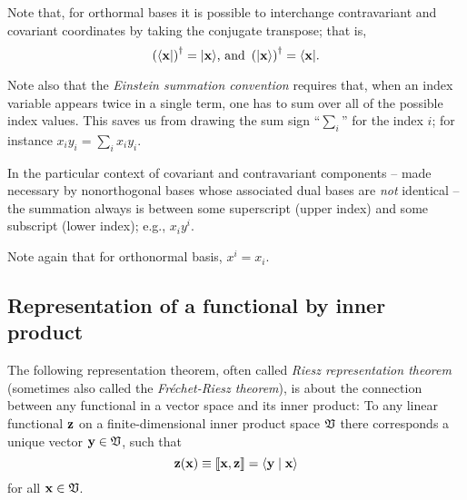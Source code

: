 Note that, for orthormal bases it is possible to interchange contravariant and covariant coordinates by
taking the conjugate transpose; that is,
\begin{equation}
\left(\langle {\bf x} \vert \right)^\dagger = \vert {\bf x}  \rangle
\textrm {, and }
\left(\vert {\bf x}  \rangle \right)^\dagger = \langle {\bf x} \vert
.
\label{2015-m-ch-fdlvs-inter}
\end{equation}


Note also that the {\em Einstein summation convention}
requires that, when an index variable appears twice in a single term, one has to
sum over all of the possible index values.
This saves us from drawing the sum sign ``$\sum_i$'' for the index $i$;
for instance $x_iy_i =\sum_{i}x_iy_i$.

In the particular context of covariant and contravariant components
--
made necessary by nonorthogonal bases whose associated dual bases are {\em not} identical
--
the summation always is between some superscript (upper index) and some subscript (lower index);
e.g., $x_iy^i$.

Note again that for orthonormal basis,
$x^i=x_i$.


\subsection{Representation of a functional by inner product}
\label{2011-m-corr-bil-ip}
The following representation theorem,
often called
{\em Riesz representation theorem}
(sometimes also called the {\em Fr\'echet-Riesz theorem}),
is about the connection between any functional
in a vector space and its inner product:
To any linear functional ${\bf z}$
on a finite-dimensional inner product space ${\frak V}$
there corresponds a unique vector   ${\bf y}\in {\frak V}$,
such that
\begin{equation}
{\bf z} ({\bf x}) \equiv \llbracket {\bf x}, {\bf z}\rrbracket = \langle {\bf y} \mid {\bf x}\rangle
\label{2015-m-ch-fdlvs-e1}
\end{equation}
for all ${\bf x}\in {\frak V}$.

